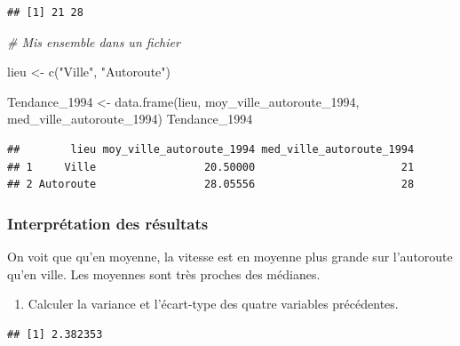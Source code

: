 \documentclass[
]{article}
\newenvironment{Shaded}{\begin{snugshade}}{\end{snugshade}}
\newcommand{\CommentTok}[1]{\textcolor[rgb]{0.56,0.35,0.01}{\textit{#1}}}
\newcommand{\FunctionTok}[1]{\textcolor[rgb]{0.00,0.00,0.00}{#1}}
\newcommand{\NormalTok}[1]{#1}
\newcommand{\OtherTok}[1]{\textcolor[rgb]{0.56,0.35,0.01}{#1}}
\newcommand{\SpecialCharTok}[1]{\textcolor[rgb]{0.00,0.00,0.00}{#1}}
\newcommand{\StringTok}[1]{\textcolor[rgb]{0.31,0.60,0.02}{#1}}
\providecommand{\tightlist}{%
  \setlength{\itemsep}{0pt}\setlength{\parskip}{0pt}}
\begin{document}
\begin{verbatim}
## [1] 21 28
\end{verbatim}

\begin{Shaded}
\begin{Highlighting}[]
\CommentTok{\# Mis ensemble dans un fichier}

\NormalTok{lieu }\OtherTok{\textless{}{-}} \FunctionTok{c}\NormalTok{(}\StringTok{"Ville"}\NormalTok{, }\StringTok{"Autoroute"}\NormalTok{)}

\NormalTok{Tendance\_1994 }\OtherTok{\textless{}{-}} \FunctionTok{data.frame}\NormalTok{(lieu, moy\_ville\_autoroute\_1994, med\_ville\_autoroute\_1994)}
\NormalTok{Tendance\_1994}
\end{Highlighting}
\end{Shaded}

\begin{verbatim}
##        lieu moy_ville_autoroute_1994 med_ville_autoroute_1994
## 1     Ville                 20.50000                       21
## 2 Autoroute                 28.05556                       28
\end{verbatim}

\hypertarget{interpruxe9tation-des-ruxe9sultats}{%
\subsubsection{Interprétation des
résultats}\label{interpruxe9tation-des-ruxe9sultats}}

On voit que qu'en moyenne, la vitesse est en moyenne plus grande sur
l'autoroute qu'en ville. Les moyennes sont très proches des médianes.

\begin{enumerate}
\def\labelenumi{\arabic{enumi}.}
\setcounter{enumi}{1}
\tightlist
\item
  Calculer la variance et l'écart-type des quatre variables précédentes.
\end{enumerate}

\begin{Shaded}
\end{Shaded}

\begin{verbatim}
## [1] 2.382353
\end{verbatim}
\end{document}
